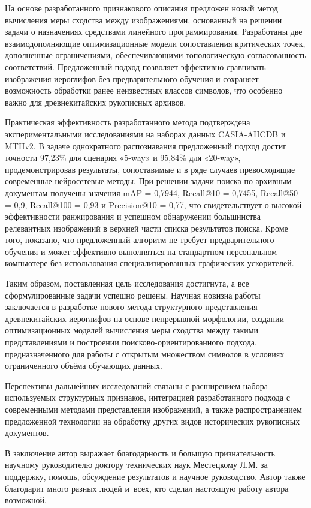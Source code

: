 На основе разработанного признакового описания предложен новый метод вычисления меры сходства между изображениями, основанный на решении задачи о назначениях средствами линейного программирования. Разработаны две взаимодополняющие оптимизационные модели сопоставления критических точек, дополненные ограничениями, обеспечивающими топологическую согласованность соответствий. Предложенный подход позволяет эффективно сравнивать изображения иероглифов без предварительного обучения и сохраняет возможность обработки ранее неизвестных классов символов, что особенно важно для древнекитайских рукописных архивов.

Практическая эффективность разработанного метода подтверждена экспериментальными исследованиями на наборах данных CASIA-AHCDB и MTHv2. В задаче однократного распознавания предложенный подход достиг точности 97,23\% для сценария «5-way» и 95,84\% для «20-way», продемонстрировав результаты, сопоставимые и в ряде случаев превосходящие современные нейросетевые методы. При решении задачи поиска по архивным документам получены значения mAP = 0,7944, Recall@10 = 0,7455, Recall@50 = 0,9, Recall@100 = 0,93 и Precision@10 = 0,77, что свидетельствует о высокой эффективности ранжирования и успешном обнаружении большинства релевантных изображений в верхней части списка результатов поиска. Кроме того, показано, что предложенный алгоритм не требует предварительного обучения и может эффективно выполняться на стандартном персональном компьютере без использования специализированных графических ускорителей.

Таким образом, поставленная цель исследования достигнута, а все сформулированные задачи успешно решены. Научная новизна работы заключается в разработке нового метода структурного представления древнекитайских иероглифов на основе непрерывной морфологии, создании оптимизационных моделей вычисления меры сходства между такими представлениями и построении поисково-ориентированного подхода, предназначенного для работы с открытым множеством символов в условиях ограниченного объёма обучающих данных.

Перспективы дальнейших исследований связаны с расширением набора используемых структурных признаков, интеграцией разработанного подхода с современными методами представления изображений, а также распространением предложенной технологии на обработку других видов исторических рукописных документов.

В заключение автор выражает благодарность и большую признательность научному руководителю доктору технических наук Местецкому Л.М. за поддержку, помощь, обсуждение результатов и научное руководство. Автор также благодарит много разных людей и~всех, кто сделал настоящую работу автора возможной.
